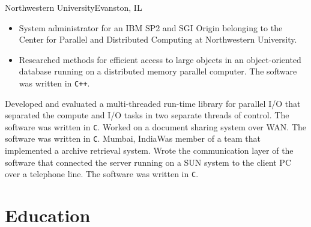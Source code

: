 \documentclass[10pt,a4paper,sans]{moderncv}
\begin{document}
{Northwestern University}{Evanston, IL}
{\begin{itemize}
	\item System administrator for an IBM SP2 and SGI Origin belonging to the
		Center for Parallel and Distributed Computing at Northwestern University.
	\item Researched methods for efficient access to large objects in an object-oriented
		database running on a distributed memory parallel computer. The
		software was written in \texttt{C++}.
	\end{itemize}}
{Developed and evaluated a multi-threaded run-time library for parallel I/O that
separated the compute and I/O tasks in two separate threads of control. The
software was written in \texttt{C}.}
{Worked on a document sharing system over WAN. The software was written in \texttt{C}.}
{Mumbai, India}{}{Was member of a team that implemented a archive retrieval system.
Wrote the communication layer of the software that connected the server running
on a SUN system to the client PC over a telephone line. The software was
written in \texttt{C}.}
\section{Education}
\end{document}
